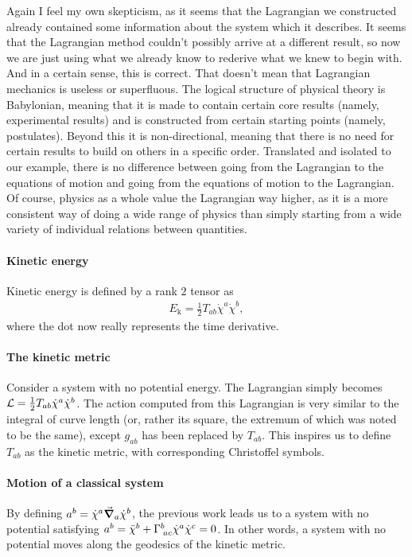 Again I feel my own skepticism, as it seems that the Lagrangian we constructed already contained some information about the system which it describes. It seems that the Lagrangian method couldn't possibly arrive at a different result, so now we are just using what we already know to rederive what we knew to begin with. And in a certain sense, this is correct. That doesn't mean that Lagrangian mechanics is useless or superfluous. The logical structure of physical theory is Babylonian, meaning that it is made to contain certain core results (namely, experimental results) and is constructed from certain starting points (namely, postulates). Beyond this it is non-directional, meaning that there is no need for certain results to build on others in a specific order. Translated and isolated to our example, there is no difference between going from the Lagrangian to the equations of motion and going from the equations of motion to the Lagrangian. Of course, physics as a whole value the Lagrangian way higher, as it is a more consistent way of doing a wide range of physics than simply starting from a wide variety of individual relations between quantities.

\paragraph{Kinetic energy}
Kinetic energy is defined by a rank $2$ tensor as
\begin{align*}
	E_{\text{k}} = \frac{1}{2}T_{ab}\dot{\chi}^{a}\dot{\chi}^{b},
\end{align*}
where the dot now really represents the time derivative.


\paragraph{The kinetic metric}
Consider a system with no potential energy. The Lagrangian simply becomes $\mathcal{L} = \frac{1}{2}T_{ab}\dot{\chi}^{a}\dot{\chi}^{b}$. The action computed from this Lagrangian is very similar to the integral of curve length (or, rather its square, the extremum of which was noted to be the same), except $g_{ab}$ has been replaced by $T_{ab}$. This inspires us to define $T_{ab}$ as the kinetic metric, with corresponding Christoffel symbols.

\paragraph{Motion of a classical system}
By defining $a^{b} = \dot{\chi}^{a}\grad_{a}{\dot{\chi}^{b}}$, the previous work leads us to a system with no potential satisfying $a^{b} = \ddot{\chi}^{b} + \Gamma^{b}_{\;ac}\dot{\chi}^{a}\dot{\chi}^{c} = 0$. In other words, a system with no potential moves along the geodesics of the kinetic metric.

